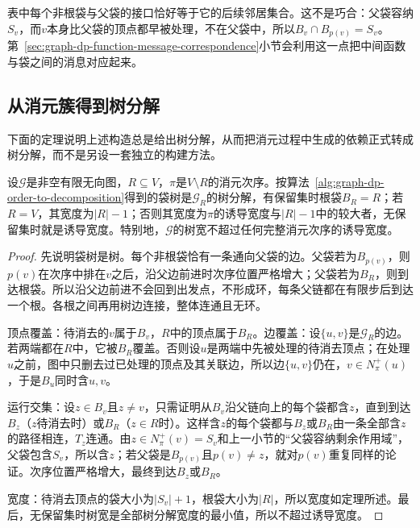 表中每个非根袋与父袋的接口恰好等于它的后续邻居集合。这不是巧合：父袋容纳$S_v$，而$v$本身比父袋的顶点都早被处理，不在父袋中，所以$B_v\cap B_{p(v)}=S_v$。第~\ref{sec:graph-dp-function-message-correspondence}小节会利用这一点把中间函数与袋之间的消息对应起来。

\subsection{从消元簇得到树分解}
\label{sec:graph-dp-clusters-to-decomposition}

下面的定理说明上述构造总是给出树分解，从而把消元过程中生成的依赖正式转成树分解，而不是另设一套独立的构建方法。

\begin{theorem}[消元次序产生树分解]
\label{thm:graph-dp-elimination-decomposition}
设$\mathcal G$是非空有限无向图，$R\subseteq V$，$\pi$是$V\setminus R$的消元次序。按算法~\ref{alg:graph-dp-order-to-decomposition}得到的袋树是$\mathcal G_R$的树分解，有保留集时根袋$B_R=R$；若$R=V$，其宽度为$|R|-1$；否则其宽度为$\pi$的诱导宽度与$|R|-1$中的较大者，无保留集时就是诱导宽度。特别地，$\mathcal G$的树宽不超过任何完整消元次序的诱导宽度。
\end{theorem}

\begin{proof}
先说明袋树是树。每个非根袋恰有一条通向父袋的边。父袋若为$B_{p(v)}$，则$p(v)$在次序中排在$v$之后，沿父边前进时次序位置严格增大；父袋若为$B_R$，则到达根袋。所以沿父边前进不会回到出发点，不形成环，每条父链都在有限步后到达一个根。各根之间再用树边连接，整体连通且无环。

顶点覆盖：待消去的$v$属于$B_v$，$R$中的顶点属于$B_R$。边覆盖：设$\{u,v\}$是$\mathcal G_R$的边。若两端都在$R$中，它被$B_R$覆盖。否则设$u$是两端中先被处理的待消去顶点；在处理$u$之前，图中只删去过已处理的顶点及其关联边，所以边$\{u,v\}$仍在，$v\in N^+_\pi(u)$，于是$B_u$同时含$u,v$。

运行交集：设$z\in B_v$且$z\neq v$，只需证明从$B_v$沿父链向上的每个袋都含$z$，直到到达$B_z$（$z$待消去时）或$B_R$（$z\in R$时）。这样含$z$的每个袋都与$B_z$或$B_R$由一条全部含$z$的路径相连，$T_z$连通。由$z\in N^+_\pi(v)=S_v$和上一小节的“父袋容纳剩余作用域”，父袋包含$S_v$，所以含$z$；若父袋是$B_{p(v)}$且$p(v)\neq z$，就对$p(v)$重复同样的论证。次序位置严格增大，最终到达$B_z$或$B_R$。

宽度：待消去顶点的袋大小为$|S_v|+1$，根袋大小为$|R|$，所以宽度如定理所述。最后，无保留集时树宽是全部树分解宽度的最小值，所以不超过诱导宽度。
\end{proof}

